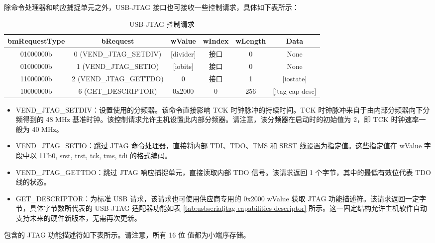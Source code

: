 \documentclass[main\_\_CN.tex]{subfiles}
\begin{document}
除命令处理器和响应捕捉单元之外，USB-JTAG 接口也可接收一些控制请求，具体如下表所示：

\begin{table}[H]
    \centering
    \caption{USB-JTAG 控制请求}
    \label{tab:usbserialjtag-control-requests}
    \begin{tabular}{|c|c|c|c|c|c|}
    \hline
       \rowcolor{lightgray}
       \textbf{bmRequestType} & \textbf{bRequest} & \textbf{wValue} & \textbf{wIndex} & \textbf{wLength} & \textbf{Data} \\\hline
       
       01000000b &  0 (VEND\_JTAG\_SETDIV) & [divider] & 接口 & 0 &  None \\\hline
       01000000b &  1 (VEND\_JTAG\_SETIO) &  [iobits] &  接口 & 0 &   None \\\hline
       11000000b &  2 (VEND\_JTAG\_GETTDO) & 0 & 接口 & 1 & [iostate] \\\hline
       10000000b &  6 (GET\_DESCRIPTOR) &   0x2000 &  0 &  256 & [jtag cap desc] \\\hline
    \end{tabular}
\end{table}

\begin{itemize}
\item VEND\_JTAG\_SETDIV：设置使用的分频器。该命令直接影响 TCK 时钟脉冲的持续时间。TCK 时钟脉冲来自于由内部分频器向下分频得到的 48 MHz 基准时钟。该控制请求允许主机设置此内部分频器。请注意，该分频器在启动时的初始值为 2，即 TCK 时钟速率一般为 40 MHz。

\item VEND\_JTAG\_SETIO：跳过 JTAG 命令处理器，直接将内部 TDI、TDO、TMS 和 SRST 线设置为指定值。这些指定值在 wValue 字段中以 {11'b0, srst, trst, tck, tms, tdi} 的格式编码。

\item VEND\_JTAG\_GETTDO：跳过 JTAG 响应捕捉单元，直接读取内部 TDO 信号。该请求返回 1 个字节，其中的最低有效位代表 TDO 线的状态。

\item GET\_DESCRIPTOR：为标准 USB 请求，该请求也可使用供应商专用的 0x2000 wValue 获取 JTAG 功能描述符。该请求返回一定字节，具体字节数所代表的 USB-JTAG 适配器功能如表 \ref{tab:usbserialjtag-capabilities-descriptor} 所示。这一固定结构允许主机软件自动支持未来的硬件新版本，无需再次更新。
\end{itemize}

\chipname{} 包含的 JTAG 功能描述符如下表所示。请注意，所有 16 位 值都为小端序存储。
\end{document}
